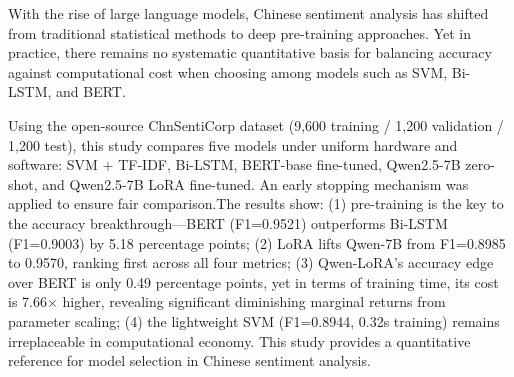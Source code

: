 \begin{abstract}
随着大语言模型的发展，中文情感分析从传统统计方法进入了深度预训练阶段。但在实际应用中，如何在 SVM、Bi-LSTM、BERT 等模型的精度和计算成本之间做取舍，仍缺少系统的量化依据。

本文基于开源数据集 ChnSentiCorp（9,600 训练 / 1,200 验证 / 1,200 测试），在统一硬件与软件环境下，对比了 SVM + TF-IDF、Bi-LSTM、BERT-base 微调、Qwen2.5-7B 零样本推理和 Qwen2.5-7B LoRA 微调五类模型，并引入早停机制保证公平。实验表明：(1)~预训练是精度突破的关键——BERT 微调（F1=0.9521）比 Bi-LSTM（F1=0.9003）高出 5.18 个百分点；(2)~LoRA 使 Qwen-7B 的 F1 从 0.8985 跃升到 0.9570，四项指标均为最优；(3)~Qwen-LoRA 对 BERT 的精度优势仅 0.49 个百分点，从训练时间来看，训练成本却是 7.66 倍，参数规模扩大的边际收益递减明显；(4)~轻量级 SVM（F1=0.8944，训练 0.32s）在计算经济性上仍有不可替代的位置。本文为中文情感分析的模型选型提供了量化参考。

\end{abstract}

\clearpage

\begin{enabstract}

With the rise of large language models, Chinese sentiment analysis has shifted from traditional statistical methods to deep pre-training approaches. Yet in practice, there remains no systematic quantitative basis for balancing accuracy against computational cost when choosing among models such as SVM, Bi-LSTM, and BERT.

Using the open-source ChnSentiCorp dataset (9,600 training / 1,200 validation / 1,200 test), this study compares five models under uniform hardware and software: SVM + TF-IDF, Bi-LSTM, BERT-base fine-tuned, Qwen2.5-7B zero-shot, and Qwen2.5-7B LoRA fine-tuned. An early stopping mechanism was applied to ensure fair comparison.The results show: (1) pre-training is the key to the accuracy breakthrough---BERT (F1=0.9521) outperforms Bi-LSTM (F1=0.9003) by 5.18 percentage points; (2) LoRA lifts Qwen-7B from F1=0.8985 to 0.9570, ranking first across all four metrics; (3) Qwen-LoRA's accuracy edge over BERT is only 0.49 percentage points, yet in terms of training time, its cost is 7.66$\times$ higher, revealing significant diminishing marginal returns from parameter scaling; (4) the lightweight SVM (F1=0.8944, 0.32s training) remains irreplaceable in computational economy. This study provides a quantitative reference for model selection in Chinese sentiment analysis.

\end{enabstract}
